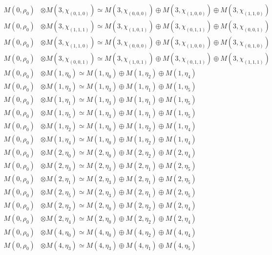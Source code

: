 \begin{align*}
M(0,\rho_{0}) &\otimes M(3,\chi_{(0,1,0)}) \simeq M(3,\chi_{(0,0,0)}) \oplus M(3,\chi_{(1,0,0)}) \oplus M(3,\chi_{(1,1,0)})\\
M(0,\rho_{0}) &\otimes M(3,\chi_{(1,1,1)}) \simeq M(3,\chi_{(1,0,1)}) \oplus M(3,\chi_{(0,1,1)}) \oplus M(3,\chi_{(0,0,1)})\\
M(0,\rho_{0}) &\otimes M(3,\chi_{(1,1,0)}) \simeq M(3,\chi_{(0,0,0)}) \oplus M(3,\chi_{(1,0,0)}) \oplus M(3,\chi_{(0,1,0)})\\
M(0,\rho_{0}) &\otimes M(3,\chi_{(0,0,1)}) \simeq M(3,\chi_{(1,0,1)}) \oplus M(3,\chi_{(0,1,1)}) \oplus M(3,\chi_{(1,1,1)})\\
M(0,\rho_{0}) &\otimes M(1,\eta_{0}) \simeq M(1,\eta_{0}) \oplus M(1,\eta_{2}) \oplus M(1,\eta_{4})\\
M(0,\rho_{0}) &\otimes M(1,\eta_{3}) \simeq M(1,\eta_{3}) \oplus M(1,\eta_{1}) \oplus M(1,\eta_{5})\\
M(0,\rho_{0}) &\otimes M(1,\eta_{1}) \simeq M(1,\eta_{3}) \oplus M(1,\eta_{1}) \oplus M(1,\eta_{5})\\
M(0,\rho_{0}) &\otimes M(1,\eta_{5}) \simeq M(1,\eta_{3}) \oplus M(1,\eta_{1}) \oplus M(1,\eta_{5})\\
M(0,\rho_{0}) &\otimes M(1,\eta_{2}) \simeq M(1,\eta_{0}) \oplus M(1,\eta_{2}) \oplus M(1,\eta_{4})\\
M(0,\rho_{0}) &\otimes M(1,\eta_{4}) \simeq M(1,\eta_{0}) \oplus M(1,\eta_{2}) \oplus M(1,\eta_{4})\\
M(0,\rho_{0}) &\otimes M(2,\eta_{0}) \simeq M(2,\eta_{0}) \oplus M(2,\eta_{2}) \oplus M(2,\eta_{4})\\
M(0,\rho_{0}) &\otimes M(2,\eta_{3}) \simeq M(2,\eta_{3}) \oplus M(2,\eta_{1}) \oplus M(2,\eta_{5})\\
M(0,\rho_{0}) &\otimes M(2,\eta_{1}) \simeq M(2,\eta_{3}) \oplus M(2,\eta_{1}) \oplus M(2,\eta_{5})\\
M(0,\rho_{0}) &\otimes M(2,\eta_{5}) \simeq M(2,\eta_{3}) \oplus M(2,\eta_{1}) \oplus M(2,\eta_{5})\\
M(0,\rho_{0}) &\otimes M(2,\eta_{2}) \simeq M(2,\eta_{0}) \oplus M(2,\eta_{2}) \oplus M(2,\eta_{4})\\
M(0,\rho_{0}) &\otimes M(2,\eta_{4}) \simeq M(2,\eta_{0}) \oplus M(2,\eta_{2}) \oplus M(2,\eta_{4})\\
M(0,\rho_{0}) &\otimes M(4,\eta_{0}) \simeq M(4,\eta_{0}) \oplus M(4,\eta_{2}) \oplus M(4,\eta_{4})\\
M(0,\rho_{0}) &\otimes M(4,\eta_{3}) \simeq M(4,\eta_{3}) \oplus M(4,\eta_{1}) \oplus M(4,\eta_{5})\\

\end{align*}
